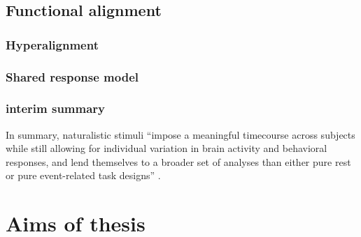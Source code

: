 \subsection{Functional alignment}


\subsubsection{Hyperalignment}


\subsubsection{Shared response model}


\subsubsection{interim summary}
In summary, naturalistic stimuli ``impose a meaningful timecourse across
subjects while still allowing for individual variation in brain activity and
behavioral responses, and lend themselves to a broader set of analyses than
either pure rest or pure event-related task designs'' \citep{finn2017can}.



\section{Aims of thesis}

